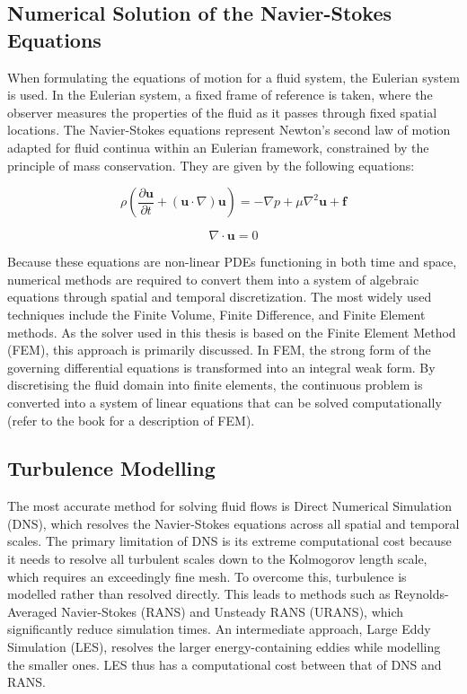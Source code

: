 \documentclass[../main]{subfiles}
\begin{document}
\subsection{Numerical Solution of the Navier-Stokes Equations} 

When formulating the equations of motion for a fluid system, the Eulerian system is used. 
In the Eulerian system, a fixed frame of reference is taken, where the observer measures 
the properties of the fluid as it passes through fixed spatial locations.
The Navier-Stokes equations represent Newton's second law of motion adapted for fluid continua within an Eulerian framework, 
constrained by the principle of mass conservation. They are given by the following equations:  

\begin{equation}
    \rho \left( \frac{\partial \mathbf{u}}{\partial t} + (\mathbf{u} \cdot \nabla) \mathbf{u} \right) = -\nabla p + \mu \nabla^2 \mathbf{u} + \mathbf{f}
\end{equation}

\begin{equation}
    \nabla \cdot \mathbf{u} = 0
\end{equation}

Because these equations are non-linear PDEs functioning in both time and space, numerical methods are required to convert 
them into a system of algebraic equations through spatial and temporal discretization. The most widely used techniques include the Finite 
Volume, Finite Difference, and Finite Element methods. As the solver used in this thesis is based on the Finite Element 
Method (FEM), this approach is primarily discussed. In FEM, the strong form of the governing differential equations is 
transformed into an integral weak form. By discretising the fluid domain into finite elements, the continuous problem is 
converted into a system of linear equations that can be solved computationally (refer to the book\cite{seshu2003} for a description of FEM).

\subsection{Turbulence Modelling} 

The most accurate method for solving fluid flows is Direct Numerical Simulation (DNS), which resolves the Navier-Stokes 
equations across all spatial and temporal scales. The primary limitation of DNS is its extreme computational cost because 
it needs to resolve all turbulent scales down to the Kolmogorov length scale, which requires an exceedingly fine mesh. To overcome this, 
turbulence is modelled rather than resolved directly. This leads to methods such as Reynolds-Averaged Navier-Stokes (RANS) 
and Unsteady RANS (URANS), which significantly reduce simulation times. An intermediate approach, Large Eddy Simulation (LES), 
resolves the larger energy-containing eddies while modelling the smaller ones. LES thus has a computational 
cost between that of DNS and RANS. \\
\end{document}
